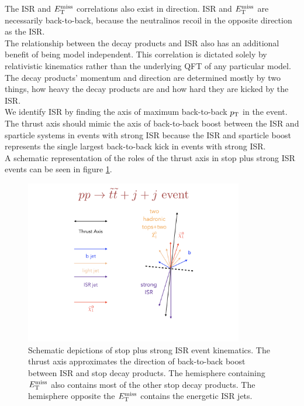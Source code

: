 \indent The ISR and $E_{\mathrm{T}}^{\mathrm{miss}}$ correlations also exist in direction.  ISR and $E_{\mathrm{T}}^{\mathrm{miss}}$ are necessarily back-to-back, because the neutralinos recoil in the opposite direction as the ISR.  \\%

\indent The relationship between the decay products and ISR also has an additional benefit of being model independent.  This correlation is dictated solely by relativistic kinematics rather than the underlying QFT of any particular model.  The decay products' momentum and direction are determined mostly by two things, how heavy the decay products are and how hard they are kicked by the ISR.  \\

\indent We identify ISR by finding the axis of maximum back-to-back $p_{\mathrm{T}}$ in the event.  The thrust axis should mimic the axis of back-to-back boost between the ISR and sparticle systems in events with strong ISR because the ISR and sparticle boost represents the single largest back-to-back kick in events with strong ISR.  \\

\indent A schematic representation of the roles of the thrust axis in stop plus strong ISR events can be seen in figure \ref{fig:ISR:ttbar_sig_example}. \\

\begin{figure}[h!]
  \centering
	\includegraphics[width=0.85\textwidth]{./figures/strategy/ISR_signal.png}
	\caption[Schematic depictions of stop plus strong ISR event kinematics]{Schematic depictions of stop plus strong ISR event kinematics.  The thrust axis approximates the direction of back-to-back boost between ISR and stop decay products.  The hemisphere containing $E_{\mathrm{T}}^{\mathrm{miss}}$ also contains most of the other stop decay products.  The hemisphere opposite the $E_{\mathrm{T}}^{\mathrm{miss}}$ contains the energetic ISR jets. }
	\label{fig:ISR:ttbar_sig_example}
\end{figure}

